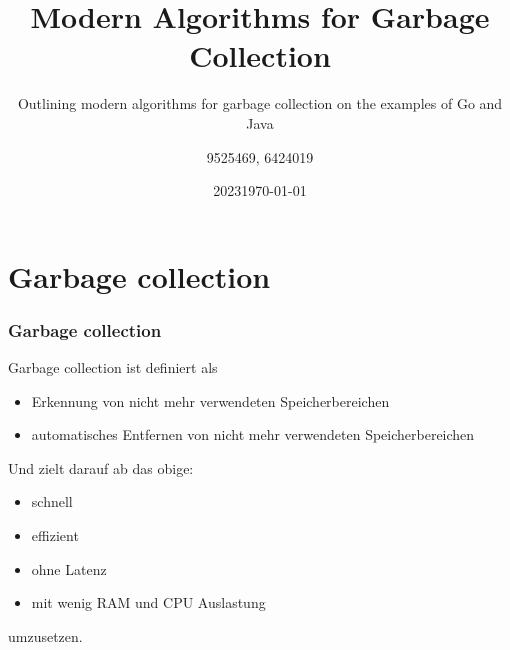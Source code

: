 \documentclass{beamer}
\title{Modern Algorithms for Garbage Collection}
\subtitle{Outlining modern algorithms for garbage collection on the examples of Go and Java}
\date[2023]{2023}
\author{9525469, 6424019}
\institute[DHBW Mosbach]{DHBW Mosbach}
\date{\today}
\begin{document}
    
    \frame{\titlepage}

    \tableofcontents
    
	\section{Garbage collection}
        \begin{frame}
            \frametitle{Garbage collection}

            Garbage collection ist definiert als

            \begin{itemize}
                \item Erkennung von nicht mehr verwendeten Speicherbereichen
                \item automatisches Entfernen von nicht mehr verwendeten Speicherbereichen
            \end{itemize}

            Und zielt darauf ab das obige:

            \begin{itemize}
                \item schnell
                \item effizient
                \item ohne Latenz
                \item mit wenig RAM und CPU Auslastung
            \end{itemize}

            umzusetzen.
        \end{frame}
\end{document}
